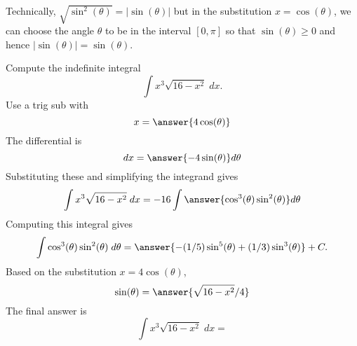 \documentclass{ximera}
\begin{document}
\begin{remark}
Technically, $\sqrt{\sin^2(\theta)} = |\sin(\theta)|$ but in the substitution
$x = \cos(\theta)$, we can choose the angle $\theta$ to be in the interval
$[0, \pi]$ so that $\sin(\theta) \geq 0$ and hence $|\sin(\theta)| = \sin(\theta)$.
\end{remark}



\begin{problem}
Compute the indefinite integral
\[
\int   x^3 \sqrt{16-x^2} \; dx.
\]
Use a trig sub with\\
\[
x = \answer{4\cos(\theta)}
\]
The differential is\\
\[
dx = \answer{-4\sin(\theta)}d\theta
\]
Substituting these and simplifying the integrand gives\\
\[
\int   x^3\sqrt{16 - x^2}\; dx = -16\int \answer{\cos^3(\theta)\sin^2(\theta)} d\theta
\]
Computing this integral gives
\[
\int \cos^3(\theta)\sin^2(\theta) \; d\theta = \answer{-(1/5)\sin^5(\theta) + (1/3)\sin^3(\theta)} + C.
\]
Based on the substitution $x = 4\cos(\theta)$, \\
\[
\sin(\theta) = \answer{\sqrt{16 - x^2}/4}
\]
The final answer is
\[
\int   x^3\sqrt{16 -  x^2}\; dx = 
\]
\begin{center}
\begin{multipleChoice}
\end{multipleChoice}
\end{center}


\end{problem}
\end{document}
